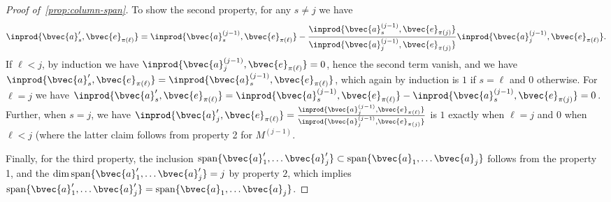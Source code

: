 \documentclass[11pt]{article}
\newcommand{\Mat}[1]{M^{(#1)}}
\begin{document}
\begin{proof}[Proof of~\cref{prop:column-span}]
	To show the second property, for any $s \not= j$ we have
	\begin{equation*}
		\inprod{\bvec{a}'_s, \bvec{e}_{\pi(\ell)}} = \inprod{\bvec{a}^{(j-1)}_s, \bvec{e}_{\pi(\ell)}} - \frac{\inprod{\bvec{a}^{(j-1)}_{s}, \bvec{e}_{\pi(j)}}}{\inprod{\bvec{a}^{(j-1)}_{j}, \bvec{e}_{\pi(j)}}} \inprod{\bvec{a}^{(j-1)}_j, \bvec{e}_{\pi(\ell)}}.
	\end{equation*}
	If $\ell < j$, by induction we have $\inprod{\bvec{a}^{(j-1)}_j, \bvec{e}_{\pi(\ell)}} = 0$, hence the second term vanish, and we have $\inprod{\bvec{a}'_s, \bvec{e}_{\pi(\ell)}} = \inprod{\bvec{a}^{(j-1)}_s, \bvec{e}_{\pi(\ell)}}$, which again by induction is $1$ if $s = \ell$ and $0$ otherwise.
	For $\ell = j$ we have $\inprod{\bvec{a}'_s, \bvec{e}_{\pi(\ell)}} = \inprod{\bvec{a}^{(j-1)}_s, \bvec{e}_{\pi(\ell)}} - \inprod{\bvec{a}^{(j-1)}_{s}, \bvec{e}_{\pi(j)}} = 0$. Further,  when $s = j$, we have $\inprod{\bvec{a}'_j, \bvec{e}_{\pi(\ell)}} = \frac{\inprod{\bvec{a}_j^{(j-1)}, \bvec{e}_{\pi(\ell)}}}{\inprod{\bvec{a}_j^{(j-1)}, \bvec{e}_{\pi(j)}}}$ is $1$ exactly when $\ell = j$ and $0$ when $\ell < j$ (where the latter claim follows from property 2 for $\Mat{j-1}$.
	
	Finally, for the third property, the inclusion $\mathrm{span}\{ \bvec{a}'_1, \ldots \bvec{a}'_j\} \subset \mathrm{span}\{\bvec{a}_1, \ldots \bvec{a}_j\}$ follows from the property 1, and the $\dim \mathrm{span}\{\bvec{a}'_1, \ldots \bvec{a}'_j\} = j$ by property $2$, which implies $\mathrm{span}\{\bvec{a}'_1, \ldots \bvec{a}'_j\} = \mathrm{span}\{\bvec{a}_1, \ldots \bvec{a}_j\}$.
\end{proof}
\end{document}
